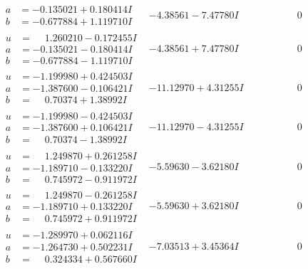 \documentclass[1p]{elsarticle_modified}
\theoremstyle{definition}
\begin{document}
$$\begin{array}{c|c|c}
\begin{aligned}
a &= -0.135021 + 0.180414 I \\
b &= -0.677884 + 1.119710 I\end{aligned}
 & -4.38561 - 7.47780 I & \phantom{-0.000000 } 0 \\ \hline\begin{aligned}
u &= \phantom{-}1.260210 - 0.172455 I \\
a &= -0.135021 - 0.180414 I \\
b &= -0.677884 - 1.119710 I\end{aligned}
 & -4.38561 + 7.47780 I & \phantom{-0.000000 } 0 \\ \hline\begin{aligned}
u &= -1.199980 + 0.424503 I \\
a &= -1.387600 - 0.106421 I \\
b &= \phantom{-}0.70374 + 1.38992 I\end{aligned}
 & -11.12970 + 4.31255 I & \phantom{-0.000000 } 0 \\ \hline\begin{aligned}
u &= -1.199980 - 0.424503 I \\
a &= -1.387600 + 0.106421 I \\
b &= \phantom{-}0.70374 - 1.38992 I\end{aligned}
 & -11.12970 - 4.31255 I & \phantom{-0.000000 } 0 \\ \hline\begin{aligned}
u &= \phantom{-}1.249870 + 0.261258 I \\
a &= -1.189710 - 0.133220 I \\
b &= \phantom{-}0.745972 - 0.911972 I\end{aligned}
 & -5.59630 - 3.62180 I & \phantom{-0.000000 } 0 \\ \hline\begin{aligned}
u &= \phantom{-}1.249870 - 0.261258 I \\
a &= -1.189710 + 0.133220 I \\
b &= \phantom{-}0.745972 + 0.911972 I\end{aligned}
 & -5.59630 + 3.62180 I & \phantom{-0.000000 } 0 \\ \hline\begin{aligned}
u &= -1.289970 + 0.062116 I \\
a &= -1.264730 + 0.502231 I \\
b &= \phantom{-}0.324334 + 0.567660 I\end{aligned}
 & -7.03513 + 3.45364 I & \phantom{-0.000000 } 0 \\ \hline\begin{aligned}

\end{aligned}
\end{array}$$
\end{document}
